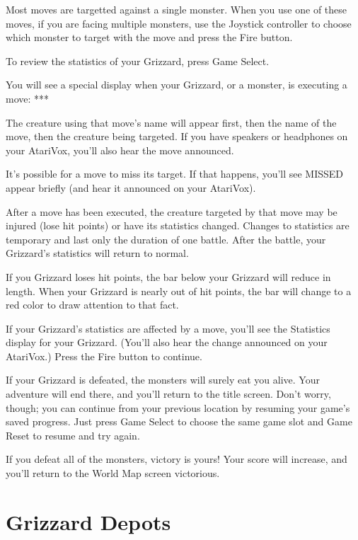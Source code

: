 \documentclass[12pt,twoside,openright,book]{memoir}
\begin{document}
Most moves are  targetted against a single monster. When  you use one of
these  moves, if  you are  facing  multiple monsters,  use the  Joystick
controller to choose which monster to target with the move and press the
Fire button.

To review the statistics of your Grizzard, press Game Select.

You will  see a  special display  when your Grizzard,  or a  monster, is
executing a move: ***

The creature using that move's name  will appear first, then the name of
the move,  then the  creature being  targeted. If  you have  speakers or
headphones on your AtariVox, you'll also hear the move announced.

It's possible for a move to miss its target. If that happens, you'll see
MISSED appear briefly (and hear it announced on your AtariVox).

After a move  has been executed, the creature targeted  by that move may
be injured (lose hit points) or  have its statistics changed. Changes to
statistics  are temporary  and last  only  the duration  of one  battle.
After the battle, your Grizzard's statistics will return to normal.

If  you Grizzard  loses hit  points, the  bar below  your Grizzard  will
reduce in  length. When your Grizzard  is nearly out of  hit points, the
bar will change to a red color to draw attention to that fact.

If your  Grizzard's statistics are  affected by  a move, you'll  see the
Statistics  display for  your  Grizzard. (You'll  also  hear the  change
announced on your AtariVox.) Press the Fire button to continue.

If your  Grizzard is defeated, the  monsters will surely eat  you alive.
Your adventure  will end there, and  you'll return to the  title screen.
Don't worry,  though; you  can continue from  your previous  location by
resuming your  game's saved progress.  Just press Game Select  to choose
the same game slot and Game Reset to resume and try again.

If you defeat all of the monsters, victory is yours! Your score will
increase, and you'll return to the World Map screen victorious.



\section{Grizzard Depots}\label{Grizzard Depots}
\end{document}
